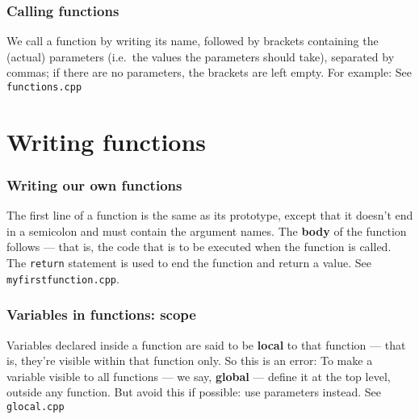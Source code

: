 \documentclass[12pt]{beamer}
\begin{document}
\begin{frame}
	\frametitle{Calling functions}
	We call a function by writing its name, followed by brackets containing
	the (actual) parameters (i.e.\ the values the parameters should take),
	separated by commas; if there are no parameters, the brackets are left
	empty. For example:
	\LstCall
    See \lstinline/functions.cpp/
\end{frame}

\section{Writing functions}

\begin{frame}
	\frametitle{Writing our own functions}
	The first line of a function is the same as its prototype, except that
	it doesn't end in a semicolon and must contain the argument names. The \textbf{body} of the function follows
	--- that is, the code that is to be executed when the function is
	called. The \lstinline/return/ statement is used to end the function and
	return a value.
	\LstFunction
    See \lstinline/myfirstfunction.cpp/.
\end{frame}

\begin{frame}
	\frametitle{Variables in functions: scope}
	Variables declared inside a function are said to be \textbf{local} to
	that function --- that is, they're visible within that function only. So
	this is an error:
	\LstScope
	To make a variable visible to all functions --- we say, \textbf{global}
	--- define it at the top level, outside any function. But avoid this if
	possible: use parameters instead.
    See \lstinline/glocal.cpp/
\end{frame}
\end{document}
